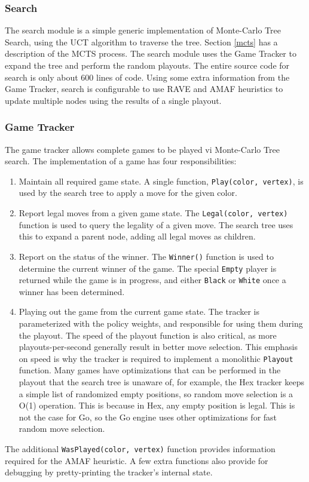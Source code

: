 \documentclass[11pt]{report}
\newcommand{\black}{\texttt{Black}}
\newcommand{\white}{\texttt{White}}
\begin{document}
\subsubsection{Search}
The search module is a simple generic implementation of Monte-Carlo Tree Search, using the UCT algorithm to traverse the tree. Section \ref{mcts} has a description of the MCTS process. The search module uses the Game Tracker to expand the tree and perform the random playouts. The entire source code for search is only about 600 lines of code. Using some extra information from the Game Tracker, search is configurable to use RAVE and AMAF heuristics to update multiple nodes using the results of a single playout.

\subsubsection{Game Tracker}
The game tracker allows complete games to be played vi Monte-Carlo Tree search. The implementation of a game has four responsibilities:
\begin{enumerate}
\item{Maintain all required game state. A single function, \texttt{Play(color, vertex)}, is used by the search tree to apply a move for the given color.}
\item{Report legal moves from a given game state. The \texttt{Legal(color, vertex)} function is used to query the legality of a given move. The search tree uses this to expand a parent node, adding all legal moves as children.}
\item{Report on the status of the winner. The \texttt{Winner()} function is used to determine the current winner of the game. The special \texttt{Empty} player is returned while the game is in progress, and either \black{} or \white{} once a winner has been determined.}
\item{Playing out the game from the current game state. The tracker is parameterized with the policy weights, and responsible for using them during the playout. The speed of the playout function is also critical, as more playouts-per-second generally result in better move selection. This emphasis on speed is why the tracker is required to implement a monolithic \texttt{Playout} function. Many games have optimizations that can be performed in the playout that the search tree is unaware of, for example, the Hex tracker keeps a simple list of randomized empty positions, so random move selection is a O(1) operation. This is because in Hex, any empty position is legal. This is not the case for Go, so the Go engine uses other optimizations for fast random move selection.}
\end{enumerate}
The additional \texttt{WasPlayed(color, vertex)} function provides information required for the AMAF heuristic. A few extra functions also provide for debugging by pretty-printing the tracker's internal state.
\end{document}
